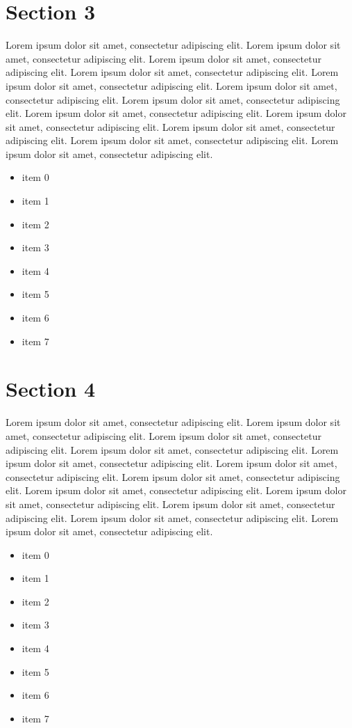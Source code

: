 \documentclass{article}
\begin{document}
\section{Section 3}
Lorem ipsum dolor sit amet, consectetur adipiscing elit. Lorem ipsum dolor sit amet, consectetur adipiscing elit. Lorem ipsum dolor sit amet, consectetur adipiscing elit. Lorem ipsum dolor sit amet, consectetur adipiscing elit. Lorem ipsum dolor sit amet, consectetur adipiscing elit. Lorem ipsum dolor sit amet, consectetur adipiscing elit. Lorem ipsum dolor sit amet, consectetur adipiscing elit. Lorem ipsum dolor sit amet, consectetur adipiscing elit. Lorem ipsum dolor sit amet, consectetur adipiscing elit. Lorem ipsum dolor sit amet, consectetur adipiscing elit. Lorem ipsum dolor sit amet, consectetur adipiscing elit. Lorem ipsum dolor sit amet, consectetur adipiscing elit. 
\begin{itemize}
\item item 0
\item item 1
\item item 2
\item item 3
\item item 4
\item item 5
\item item 6
\item item 7
\end{itemize}

\section{Section 4}
Lorem ipsum dolor sit amet, consectetur adipiscing elit. Lorem ipsum dolor sit amet, consectetur adipiscing elit. Lorem ipsum dolor sit amet, consectetur adipiscing elit. Lorem ipsum dolor sit amet, consectetur adipiscing elit. Lorem ipsum dolor sit amet, consectetur adipiscing elit. Lorem ipsum dolor sit amet, consectetur adipiscing elit. Lorem ipsum dolor sit amet, consectetur adipiscing elit. Lorem ipsum dolor sit amet, consectetur adipiscing elit. Lorem ipsum dolor sit amet, consectetur adipiscing elit. Lorem ipsum dolor sit amet, consectetur adipiscing elit. Lorem ipsum dolor sit amet, consectetur adipiscing elit. Lorem ipsum dolor sit amet, consectetur adipiscing elit. 
\begin{itemize}
\item item 0
\item item 1
\item item 2
\item item 3
\item item 4
\item item 5
\item item 6
\item item 7
\end{itemize}
\end{document}
